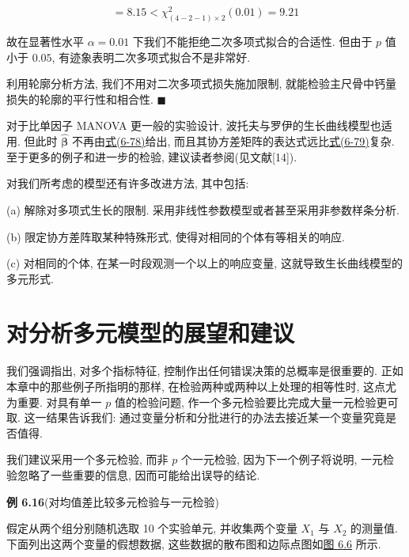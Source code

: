 \[
=8.15<\chi_{(4-2-1)\times 2}^{2}(0.01)=9.21
\]

故在显著性水平 $\alpha=0.01$ 下我们不能拒绝二次多项式拟合的合适性. 但由于 $p$ 值小于 $0.05$, 有迹象表明二次多项式拟合不是非常好.

利用轮廓分析方法, 我们不用对二次多项式损失施加限制, 就能检验主尺骨中钙量损失的轮廓的平行性和相合性. \hfill$\blacksquare$

对于比单因子 MANOVA 更一般的实验设计, 波托夫与罗伊的生长曲线模型也适用. 但此时 $\hat{\boldsymbol{\beta}}$ 不再由\hyperref[eq:6-78]{式(6-78)}给出, 而且其协方差矩阵的表达式远比\hyperref[eq:6-79]{式(6-79)}复杂. 至于更多的例子和进一步的检验, 建议读者参阅(见文献[14]).

对我们所考虑的模型还有许多改进方法, 其中包括:

(a) 解除对多项式生长的限制. 采用非线性参数模型或者甚至采用非参数样条分析.

(b) 限定协方差阵取某种特殊形式, 使得对相同的个体有等相关的响应.

(c) 对相同的个体, 在某一时段观测一个以上的响应变量, 这就导致生长曲线模型的多元形式.

\section{对分析多元模型的展望和建议}
\label{sec:6.10}

我们强调指出, 对多个指标特征, 控制作出任何错误决策的总概率是很重要的. 正如本章中的那些例子所指明的那样, 在检验两种或两种以上处理的相等性时, 这点尤为重要. 对具有单一 $p$ 值的检验问题, 作一个多元检验要比完成大量一元检验更可取. 这一结果告诉我们: 通过变量分析和分批进行的办法去接近某一个变量究竟是否值得.

我们建议采用一个多元检验, 而非 $p$ 个一元检验, 因为下一个例子将说明, 一元检验忽略了一些重要的信息, 因而可能给出误导的结论.

\noindent\textbf{例 6.16}\quad (对均值差比较多元检验与一元检验)

假定从两个组分别随机选取 10 个实验单元, 并收集两个变量 $X_1$ 与 $X_2$ 的测量值. 下面列出这两个变量的假想数据, 这些数据的散布图和边际点图如\hyperref[fig:6.6]{图 6.6} 所示.


